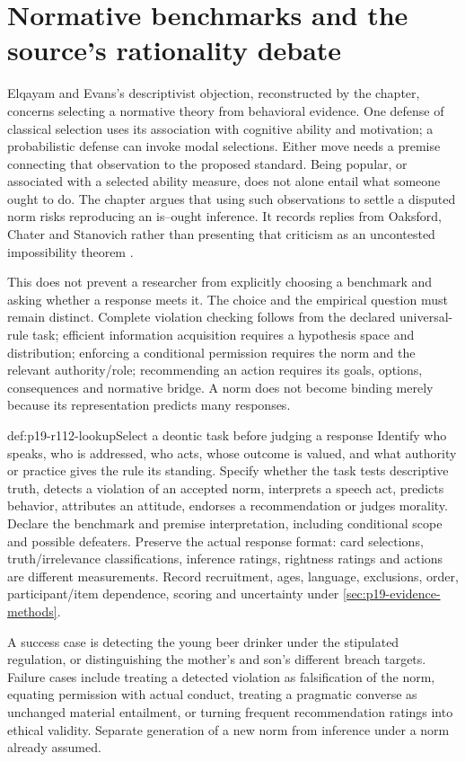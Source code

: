 \section{Normative benchmarks and the source's rationality debate}
\label{sec:p19-r112-debate}

Elqayam and Evans's descriptivist objection, reconstructed by the chapter,
concerns selecting a normative theory from behavioral evidence. One defense
of classical selection uses its association with cognitive ability and
motivation; a probabilistic defense can invoke modal selections. Either
move needs a premise connecting that observation to the proposed standard.
Being popular, or associated with a selected ability measure, does not
alone entail what someone ought to do. The chapter argues that using such
observations to settle a disputed norm risks reproducing an is--ought inference.
It records replies from Oaksford, Chater and Stanovich rather than presenting
that criticism as an uncontested impossibility theorem
\cite[pp.~654--655]{Elqayam2021DeonticPsychology}.

This does not prevent a researcher from explicitly choosing a benchmark and
asking whether a response meets it. The choice and the empirical question
must remain distinct. Complete violation checking follows from the declared
universal-rule task; efficient information acquisition requires a hypothesis
space and distribution; enforcing a conditional permission requires the
norm and the relevant authority/role; recommending an action requires its
goals, options, consequences and normative bridge. A norm does not become
binding merely because its representation predicts many responses.

\begin{hbmethod}{def:p19-r112-lookup}{Select a deontic task before judging a response}
Identify who speaks, who is addressed, who acts, whose outcome is valued,
and what authority or practice gives the rule its standing. Specify whether
the task tests descriptive truth, detects a violation of an accepted norm,
interprets a speech act, predicts behavior, attributes an attitude, endorses
a recommendation or judges morality. Declare the benchmark and premise
interpretation, including conditional scope and possible defeaters. Preserve
the actual response format: card selections, truth/irrelevance classifications,
inference ratings, rightness ratings and actions are different measurements.
Record recruitment, ages, language, exclusions, order, participant/item
dependence, scoring and uncertainty under
\cref{sec:p19-evidence-methods}.

A success case is detecting the young beer drinker under the stipulated
regulation, or distinguishing the mother's and son's different breach targets.
Failure cases include treating a detected violation as falsification of the
norm, equating permission with actual conduct, treating a pragmatic converse
as unchanged material entailment, or turning frequent recommendation ratings
into ethical validity. Separate generation of a new norm from inference
under a norm already assumed.
\end{hbmethod}

